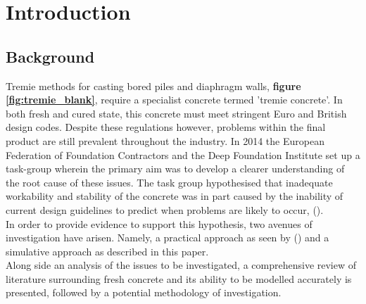 
\chapter{Introduction}  %

\ifpdf
    \graphicspath{{Chapter1/Figs/Raster/}{Chapter1/Figs/PDF/}{Chapter1/Figs/}}
\else
    \graphicspath{{Chapter1/Figs/Vector/}{Chapter1/Figs/}}
\fi

\newcommand{\citetex}[1]{\citeauthor{#1} (\citeyear{#1})}
\newcommand{\citebrac}[1]{(\citeauthor{#1}, \citeyear{#1})}

\section{Background}

Tremie methods for casting bored piles and diaphragm walls, {\bfseries figure \ref{fig:tremie_blank}}, require a specialist concrete termed 'tremie concrete'. In both fresh and cured state, this concrete must meet stringent Euro and British design codes. Despite these regulations however, problems within the final product are still prevalent throughout the industry. In 2014 the European Federation of Foundation Contractors and the Deep Foundation Institute set up a task-group wherein the primary aim was to develop a clearer understanding of the root cause of these issues. The task group hypothesised that inadequate workability and stability of the concrete was in part caused by the inability of current design guidelines to predict when problems are likely to occur, \citetex{EFFC}.\\

\noindent
In order to provide evidence to support this hypothesis, two avenues of investigation have arisen. Namely, a practical approach as seen by \citetex{bjorn}  and a simulative approach as described in this paper.\\

\noindent
Along side an analysis of the issues to be investigated, a comprehensive review of literature surrounding fresh concrete and its ability to be modelled accurately is presented, followed by a potential methodology of investigation. 

